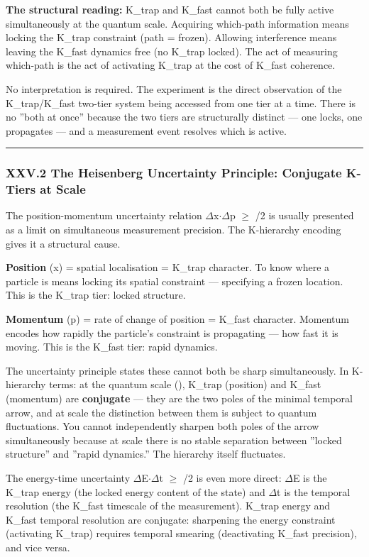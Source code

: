 \documentclass[12pt,a4paper]{article}
\begin{document}
\textbf{The structural reading:} K\_trap and K\_fast cannot both be fully active simultaneously at the quantum scale. Acquiring which-path information means locking the K\_trap constraint (path = frozen). Allowing interference means leaving the K\_fast dynamics free (no K\_trap locked). The act of measuring which-path is the act of activating K\_trap at the cost of K\_fast coherence.

No interpretation is required. The experiment is the direct observation of the K\_trap/K\_fast two-tier system being accessed from one tier at a time. There is no ''both at once'' because the two tiers are structurally distinct --- one locks, one propagates --- and a measurement event resolves which is active.

\begin{center}
\rule{0.5\textwidth}{0.4pt}
\end{center}

\subsubsection{XXV.2 The Heisenberg Uncertainty Principle: Conjugate K-Tiers at \hbar Scale}

The position-momentum uncertainty relation $\Delta$x$\cdot$$\Delta$p $\geq$ \hbar/2 is usually presented as a limit on simultaneous measurement precision. The K-hierarchy encoding gives it a structural cause.

\textbf{Position} (x) = spatial localisation = K\_trap character. To know where a particle is means locking its spatial constraint --- specifying a frozen location. This is the K\_trap tier: locked structure.

\textbf{Momentum} (p) = rate of change of position = K\_fast character. Momentum encodes how rapidly the particle's constraint is propagating --- how fast it is moving. This is the K\_fast tier: rapid dynamics.

The uncertainty principle states these cannot both be sharp simultaneously. In K-hierarchy terms: at the quantum scale (\hbar), K\_trap (position) and K\_fast (momentum) are \textbf{conjugate} --- they are the two poles of the minimal temporal arrow, and at \hbar scale the distinction between them is subject to quantum fluctuations. You cannot independently sharpen both poles of the arrow simultaneously because at \hbar scale there is no stable separation between ''locked structure'' and ''rapid dynamics.'' The hierarchy itself fluctuates.

The energy-time uncertainty $\Delta$E$\cdot$$\Delta$t $\geq$ \hbar/2 is even more direct: $\Delta$E is the K\_trap energy (the locked energy content of the state) and $\Delta$t is the temporal resolution (the K\_fast timescale of the measurement). K\_trap energy and K\_fast temporal resolution are conjugate: sharpening the energy constraint (activating K\_trap) requires temporal smearing (deactivating K\_fast precision), and vice versa.
\end{document}
